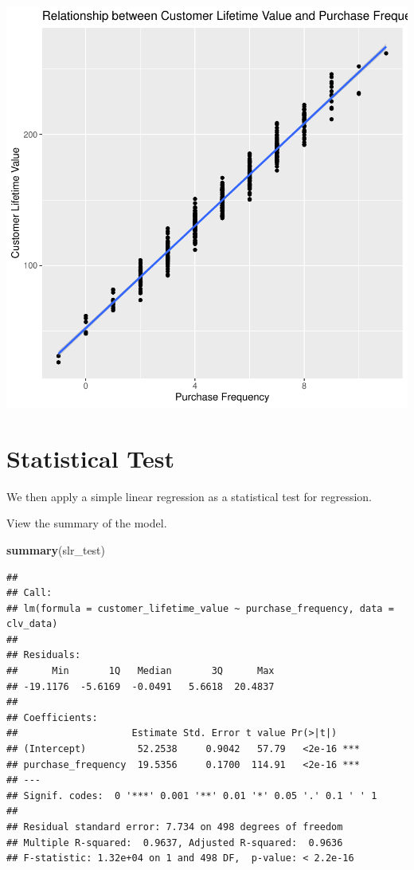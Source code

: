 \documentclass[
]{article}
\newenvironment{Shaded}{\begin{snugshade}}{\end{snugshade}}
\newcommand{\FunctionTok}[1]{\textcolor[rgb]{0.13,0.29,0.53}{\textbf{#1}}}
\newcommand{\NormalTok}[1]{#1}
\begin{document}
\includegraphics{1_simple_linear_regression_files/figure-latex/scatter_plot_2-1.pdf}

\section{Statistical Test}\label{statistical-test}

We then apply a simple linear regression as a statistical test for
regression.

View the summary of the model.

\begin{Shaded}
\begin{Highlighting}[]
\FunctionTok{summary}\NormalTok{(slr\_test)}
\end{Highlighting}
\end{Shaded}

\begin{verbatim}
## 
## Call:
## lm(formula = customer_lifetime_value ~ purchase_frequency, data = clv_data)
## 
## Residuals:
##      Min       1Q   Median       3Q      Max 
## -19.1176  -5.6169  -0.0491   5.6618  20.4837 
## 
## Coefficients:
##                    Estimate Std. Error t value Pr(>|t|)    
## (Intercept)         52.2538     0.9042   57.79   <2e-16 ***
## purchase_frequency  19.5356     0.1700  114.91   <2e-16 ***
## ---
## Signif. codes:  0 '***' 0.001 '**' 0.01 '*' 0.05 '.' 0.1 ' ' 1
## 
## Residual standard error: 7.734 on 498 degrees of freedom
## Multiple R-squared:  0.9637, Adjusted R-squared:  0.9636 
## F-statistic: 1.32e+04 on 1 and 498 DF,  p-value: < 2.2e-16
\end{verbatim}
\end{document}
